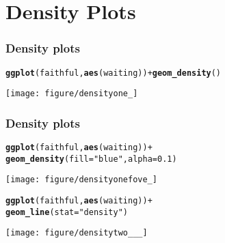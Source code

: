 \documentclass{beamer}\usepackage[]{graphicx}\usepackage[]{color}
\makeatletter
\newcommand{\hlstr}[1]{\textcolor[rgb]{0.192,0.494,0.8}{#1}}%
\newcommand{\hlkwd}[1]{\textcolor[rgb]{0.737,0.353,0.396}{\textbf{#1}}}%
\newenvironment{kframe}{%
 \def\at@end@of@kframe{}%
 \ifinner\ifhmode%
  \def\at@end@of@kframe{\end{minipage}}%
  \begin{minipage}{\columnwidth}%
 \fi\fi%
 \def\FrameCommand##1{\hskip\@totalleftmargin \hskip-\fboxsep
 \colorbox{shadecolor}{##1}\hskip-\fboxsep
     \hskip-\linewidth \hskip-\@totalleftmargin \hskip\columnwidth}%
 \MakeFramed {\advance\hsize-\width
   \@totalleftmargin\z@ \linewidth\hsize
   \@setminipage}}%
 {\par\unskip\endMakeFramed%
 \at@end@of@kframe}
\newenvironment{knitrout}{}{} %
\makeatother
\begin{document}
\section*{Density Plots}
\frame{\sectionpage}

\begin{frame}[fragile]
\frametitle{Density plots}
\begin{knitrout}\footnotesize
{}\color{fgcolor}\begin{kframe}
\begin{alltt}
\hlkwd{ggplot}(faithful, \hlkwd{aes}(waiting)) + \hlkwd{geom_density}()
\end{alltt}
\end{kframe}

{\centering \texttt{[image: figure/densityone\_]} 

}



\end{knitrout}

\end{frame}

\begin{frame}[fragile]
\frametitle{Density plots}
\begin{knitrout}\footnotesize
{}\color{fgcolor}\begin{kframe}
\begin{alltt}
\hlkwd{ggplot}(faithful, \hlkwd{aes}(waiting)) +
\hlkwd{geom_density}(fill = \hlstr{"blue"}, alpha = 0.1)
\end{alltt}
\end{kframe}

{\centering \texttt{[image: figure/densityonefove\_]} 

}



\end{knitrout}

\end{frame}



\begin{frame}[fragile]
\begin{knitrout}\footnotesize
{}\color{fgcolor}\begin{kframe}
\begin{alltt}
\hlkwd{ggplot}(faithful, \hlkwd{aes}(waiting)) +
\hlkwd{geom_line}(stat = \hlstr{"density"})
\end{alltt}
\end{kframe}

{\centering \texttt{[image: figure/densitytwo\_\_\_]} 

}



\end{knitrout}

\end{frame}
\end{document}
